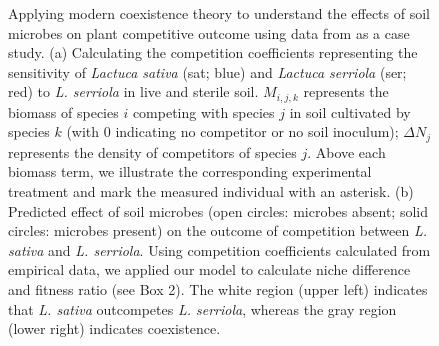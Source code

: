 \clearpage
\begin{figure}[h!]
	\centering
	\caption[Applying modern coexistence theory to understand the effects of soil microbes on plant competitive outcome using data from \citet{Aguilera2017}as a case study.]
		{\hspace{1mm}Applying modern coexistence theory to understand the effects of soil microbes on plant competitive outcome using data from \citet{Aguilera2017}as a case study. (a) Calculating the competition coefficients representing the sensitivity of \textit{Lactuca sativa} (sat; blue) and \textit{Lactuca serriola} (ser; red) to \textit{L. serriola} in live and sterile soil. $M_{i,j,k}$ represents the biomass of species $i$ competing with species $j$ in soil cultivated by species $k$  (with $0$ indicating no competitor or no soil inoculum); $\Delta N_j$ represents the density of competitors of species $j$. Above each biomass term, we illustrate the corresponding experimental treatment and mark the measured individual with an asterisk. (b) Predicted effect of soil microbes (open circles: microbes absent; solid circles: microbes present) on the outcome of competition between \textit{L. sativa} and \textit{L. serriola}. Using competition coefficients calculated from empirical data, we applied our model to calculate niche difference and fitness ratio (see Box 2). The white region (upper left) indicates that \textit{L. sativa} outcompetes \textit{L. serriola}, whereas the gray region (lower right) indicates coexistence.}
	\label{fig:Aguilera2017Data}
\end{figure}



